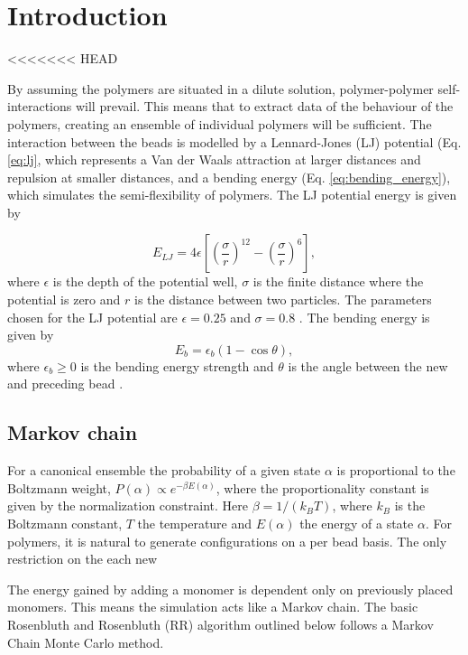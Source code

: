 \section{Introduction}

<<<<<<< HEAD

By assuming the polymers are situated in a dilute solution, polymer-polymer self-interactions will prevail. This means that to extract data of the behaviour of the polymers, creating an ensemble of individual polymers will be sufficient.
The interaction between the beads is modelled by a Lennard-Jones (LJ) potential (Eq. \ref{eq:lj}, which represents a Van der Waals attraction at larger distances and repulsion at smaller distances, and a bending energy (Eq. \ref{eq:bending_energy}), which simulates the semi-flexibility of polymers. The LJ potential energy is given by 

\begin{equation}\label{eq:lj}
   E_{LJ} = 4\epsilon \left[ \left(\frac{\sigma}{r}\right)^{12} - \left(\frac{\sigma}{r}\right)^{6} \right],
\end{equation} where $\epsilon$ is the depth of the potential well, $\sigma$ is the finite distance where the potential is zero and $r$ is the distance between two particles. The parameters chosen for the LJ potential are $\epsilon=0.25$ and $\sigma=0.8$ \cite{jmt}. The bending energy is given by
\begin{equation}\label{eq:bending_energy}
    E_{b} = \epsilon_b(1-\cos{\theta}),
\end{equation} where $\epsilon_b\geq 0$ is the bending energy strength and $\theta$ is the angle between the new and preceding bead \cite{hsu2011review}.

\subsection{Markov chain}
For a canonical ensemble the probability of a given state $\alpha$ is proportional to the Boltzmann weight, $P(\alpha) \propto e^{-\beta E(\alpha)}$, where the proportionality constant is given by the normalization constraint.  Here $\beta=1/\left(k_B T\right)$, where $k_B$ is the Boltzmann constant, $T$ the temperature and $E(\alpha)$ the energy of a state $\alpha$. For polymers, it is natural to generate configurations on a per bead basis. The only restriction on the each new 

The energy gained by adding a monomer is dependent only on previously placed monomers. This means the simulation acts like a Markov chain. The basic Rosenbluth and Rosenbluth (RR) algorithm outlined below follows a Markov Chain Monte Carlo method.




